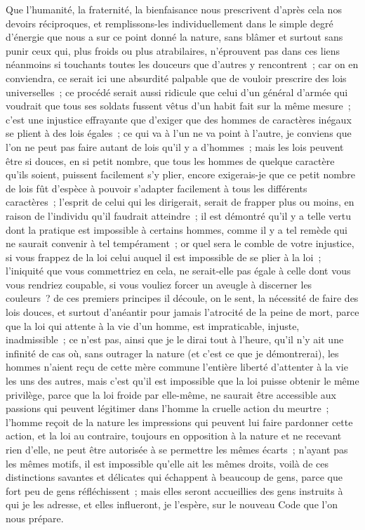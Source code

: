 \documentclass[french,twoside]{book} %
\begin{document}
Que l’humanité, la fraternité, la bienfaisance nous prescrivent d’après cela nos devoirs réciproques, et remplissons-les individuellement dans le simple degré d’énergie que nous a sur ce point donné la nature, sans blâmer et surtout sans punir ceux qui, plus froids ou plus atrabilaires, n’éprouvent pas dans ces liens néanmoins si touchants toutes les douceurs que d’autres y rencontrent ; car on en conviendra, ce serait ici une absurdité palpable que de vouloir prescrire des lois universelles ; ce procédé serait aussi ridicule que celui d’un général d’armée qui voudrait que tous ses soldats fussent vêtus d’un habit fait sur la même mesure ; c’est une injustice effrayante que d’exiger que des hommes de caractères inégaux se plient à des lois égales ; ce qui va à l’un ne va point à l’autre, je conviens que l’on ne peut pas faire autant de lois qu’il y a d’hommes ; mais les lois peuvent être si douces, en si petit nombre, que tous les hommes de quelque caractère qu’ils soient, puissent facilement s’y plier, encore exigerais-je que ce petit nombre de lois fût d’espèce à pouvoir s’adapter facilement à tous les différents caractères ; l’esprit de celui qui les dirigerait, serait de frapper plus ou moins, en raison de l’individu qu’il faudrait atteindre ; il est démontré qu’il y a telle vertu dont la pratique est impossible à certains hommes, comme il y a tel remède qui ne saurait convenir à tel tempérament ; or quel sera le comble de votre injustice, si vous frappez de la loi celui auquel il est impossible de se plier à la loi ; l’iniquité que vous commettriez en cela, ne serait-elle pas égale à celle dont vous vous rendriez coupable, si vous vouliez forcer un aveugle à discerner les couleurs ? de ces premiers principes il découle, on le sent, la nécessité de faire des lois douces, et surtout d’anéantir pour jamais l’atrocité de la peine de mort, parce que la loi qui attente à la vie d’un homme, est impraticable, injuste, inadmissible ; ce n’est pas, ainsi que je le dirai tout à l’heure, qu’il n’y ait une infinité de cas où, sans outrager la nature (et c’est ce que je démontrerai), les hommes n’aient reçu de cette mère commune l’entière liberté d’attenter à la vie les uns des autres, mais c’est qu’il est impossible que la loi puisse obtenir le même privilège, parce que la loi froide par elle-même, ne saurait être accessible aux passions qui peuvent légitimer dans l’homme la cruelle action du meurtre ; l’homme reçoit de la nature les impressions qui peuvent lui faire pardonner cette action, et la loi au contraire, toujours en opposition à la nature et ne recevant rien d’elle, ne peut être autorisée à se permettre les mêmes écarts ; n’ayant pas les mêmes motifs, il est impossible qu’elle ait les mêmes droits, voilà de ces distinctions savantes et délicates qui échappent à beaucoup de gens, parce que fort peu de gens réfléchissent ; mais elles seront accueillies des gens instruits à qui je les adresse, et elles influeront, je l’espère, sur le nouveau Code que l’on nous prépare.\par
\end{document}
